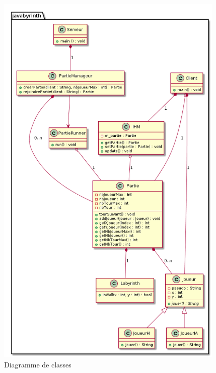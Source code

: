 \begin{figure}[h]%
	\centering
	\includegraphics[height=18.5cm]{images/UML_diagClass.png}%
	\caption{Diagramme de classes}%
	\label{fig:diagClass}%
\end{figure}
